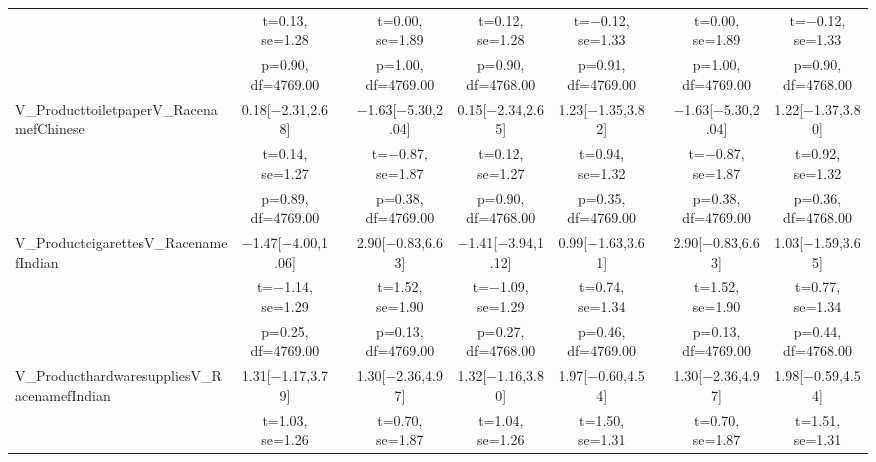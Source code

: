 \documentclass[]{report}
\begin{document}
\begin{table}
{\begin{tabular}[t]{lcccccccc}
		& t=\num{0.13}, se=\num{1.28} &  & t=\num{0.00}, se=\num{1.89} & t=\num{0.12}, se=\num{1.28} & t=\num{-0.12}, se=\num{1.33} &  & t=\num{0.00}, se=\num{1.89} & t=\num{-0.12}, se=\num{1.33}\\
		& p=\num{0.90}, df=\num{4769.00} &  & p=\num{1.00}, df=\num{4769.00} & p=\num{0.90}, df=\num{4768.00} & p=\num{0.91}, df=\num{4769.00} &  & p=\num{1.00}, df=\num{4769.00} & p=\num{0.90}, df=\num{4768.00}\\
		V\_ProducttoiletpaperV\_RacenamefChinese & \num{0.18}[\num{-2.31},\num{2.68}] &  & \num{-1.63}[\num{-5.30},\num{2.04}] & \num{0.15}[\num{-2.34},\num{2.65}] & \num{1.23}[\num{-1.35},\num{3.82}] &  & \num{-1.63}[\num{-5.30},\num{2.04}] & \num{1.22}[\num{-1.37},\num{3.80}]\\
		& t=\num{0.14}, se=\num{1.27} &  & t=\num{-0.87}, se=\num{1.87} & t=\num{0.12}, se=\num{1.27} & t=\num{0.94}, se=\num{1.32} &  & t=\num{-0.87}, se=\num{1.87} & t=\num{0.92}, se=\num{1.32}\\
		& p=\num{0.89}, df=\num{4769.00} &  & p=\num{0.38}, df=\num{4769.00} & p=\num{0.90}, df=\num{4768.00} & p=\num{0.35}, df=\num{4769.00} &  & p=\num{0.38}, df=\num{4769.00} & p=\num{0.36}, df=\num{4768.00}\\
		V\_ProductcigarettesV\_RacenamefIndian & \num{-1.47}[\num{-4.00},\num{1.06}] &  & \num{2.90}[\num{-0.83},\num{6.63}] & \num{-1.41}[\num{-3.94},\num{1.12}] & \num{0.99}[\num{-1.63},\num{3.61}] &  & \num{2.90}[\num{-0.83},\num{6.63}] & \num{1.03}[\num{-1.59},\num{3.65}]\\
		& t=\num{-1.14}, se=\num{1.29} &  & t=\num{1.52}, se=\num{1.90} & t=\num{-1.09}, se=\num{1.29} & t=\num{0.74}, se=\num{1.34} &  & t=\num{1.52}, se=\num{1.90} & t=\num{0.77}, se=\num{1.34}\\
		& p=\num{0.25}, df=\num{4769.00} &  & p=\num{0.13}, df=\num{4769.00} & p=\num{0.27}, df=\num{4768.00} & p=\num{0.46}, df=\num{4769.00} &  & p=\num{0.13}, df=\num{4769.00} & p=\num{0.44}, df=\num{4768.00}\\
		V\_ProducthardwaresuppliesV\_RacenamefIndian & \num{1.31}[\num{-1.17},\num{3.79}] &  & \num{1.30}[\num{-2.36},\num{4.97}] & \num{1.32}[\num{-1.16},\num{3.80}] & \num{1.97}[\num{-0.60},\num{4.54}] &  & \num{1.30}[\num{-2.36},\num{4.97}] & \num{1.98}[\num{-0.59},\num{4.54}]\\
		& t=\num{1.03}, se=\num{1.26} &  & t=\num{0.70}, se=\num{1.87} & t=\num{1.04}, se=\num{1.26} & t=\num{1.50}, se=\num{1.31} &  & t=\num{0.70}, se=\num{1.87} & t=\num{1.51}, se=\num{1.31}\\

\end{tabular}}
\end{table}
\end{document}

